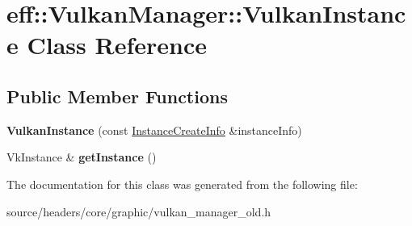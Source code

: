 \hypertarget{classeff_1_1VulkanManager_1_1VulkanInstance}{}\section{eff\+:\+:Vulkan\+Manager\+:\+:Vulkan\+Instance Class Reference}
\label{classeff_1_1VulkanManager_1_1VulkanInstance}
\subsection*{Public Member Functions}
\begin{DoxyCompactItemize}
\item 
\mbox{\label{classeff_1_1VulkanManager_1_1VulkanInstance_a0c92ac2fc7a0d68e29045038cbb9b276}} 
{\bfseries Vulkan\+Instance} (const \mbox{\hyperlink{structeff_1_1VulkanManager_1_1InstanceCreateInfo}{Instance\+Create\+Info}} \&instance\+Info)
\item 
\mbox{\label{classeff_1_1VulkanManager_1_1VulkanInstance_a54492f9833aa5498961b6cdd635c4585}} 
Vk\+Instance \& {\bfseries get\+Instance} ()
\end{DoxyCompactItemize}


The documentation for this class was generated from the following file\+:\begin{DoxyCompactItemize}
\item 
source/headers/core/graphic/vulkan\+\_\+manager\+\_\+old.\+h\end{DoxyCompactItemize}
